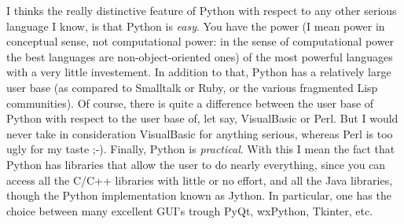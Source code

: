 \documentclass[10pt,english]{article}
\begin{document}
I thinks the really distinctive feature of Python with respect to
any other serious language I know, is that Python is \emph{easy}. You have the 
power (I mean power in conceptual sense, not computational power: in
the sense of computational power the best languages are
non-object-oriented ones) 
of the most powerful languages with a very little investement.
In addition to that, Python has a relatively large user base 
(as compared to Smalltalk or Ruby, or the various fragmented Lisp
communities). Of course, 
there is quite a difference between the user base of Python with
respect to the user base of, let say, VisualBasic or Perl. But 
I would never take in consideration VisualBasic for anything serious, 
whereas Perl is too ugly for my taste ;-).  
Finally, Python is \emph{practical}. With this I mean the fact that 
Python has libraries that
allow the user to do nearly everything, since you can access all the C/C++ 
libraries with little or no effort, and all the Java libraries, though the
Python implementation known as Jython. In particular, one has the choice
between many excellent GUI's trough PyQt, wxPython, Tkinter, etc.
\end{document}
